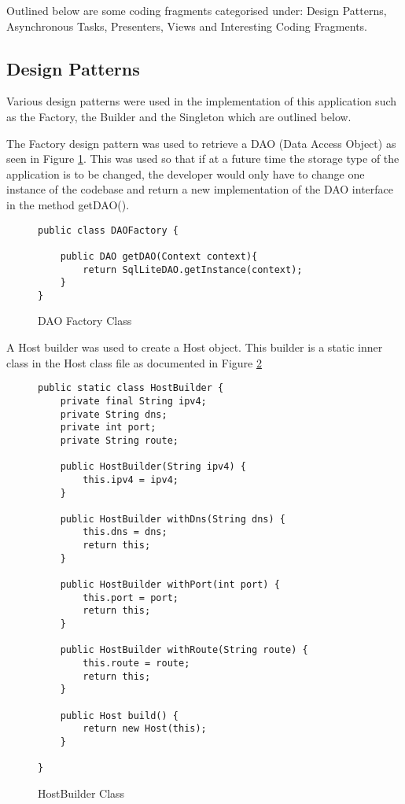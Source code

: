 Outlined below are some coding fragments categorised under: Design Patterns, Asynchronous Tasks, Presenters, Views and Interesting Coding Fragments.

\tocless\subsection{Design Patterns}
Various design patterns were used in the implementation of this application such as the Factory, the Builder and the Singleton which are outlined below.

The Factory design pattern was used to retrieve a DAO (Data Access Object) as seen in Figure \ref{lst:daoFactory}.
This was used so that if at a future time the storage type of the application is to be changed, the developer would only have to change one instance of the codebase and return a new implementation of the DAO interface in the method getDAO().
\begin{figure}[h]
\caption{DAO Factory Class}
\label{lst:daoFactory}
\begin{lstlisting}[style=Java]
public class DAOFactory {

    public DAO getDAO(Context context){
        return SqlLiteDAO.getInstance(context);
    }
}
\end{lstlisting}
\end{figure}

A Host builder was used to create a Host object.
This builder is a static inner class in the Host class file as documented in Figure \ref{lst:hostBuilder}
\begin{figure}[h]
\caption{HostBuilder Class}
\label{lst:hostBuilder}
\begin{lstlisting}[style=Java]
public static class HostBuilder {
    private final String ipv4;
    private String dns;
    private int port;
    private String route;

    public HostBuilder(String ipv4) {
        this.ipv4 = ipv4;
    }

    public HostBuilder withDns(String dns) {
        this.dns = dns;
        return this;
    }

    public HostBuilder withPort(int port) {
        this.port = port;
        return this;
    }

    public HostBuilder withRoute(String route) {
        this.route = route;
        return this;
    }

    public Host build() {
        return new Host(this);
    }

}
\end{lstlisting}
\end{figure}

